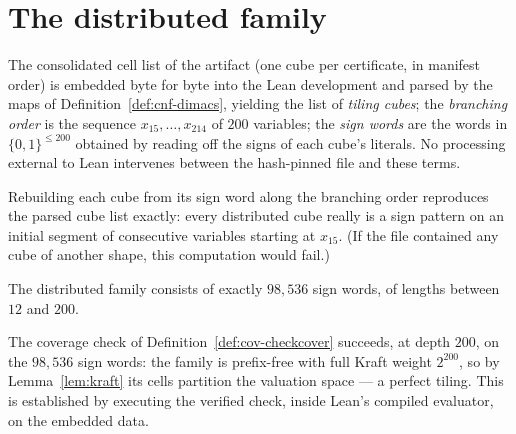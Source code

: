 \section{The distributed family}

\begin{definition}\label{def:cov-tiling}
The consolidated cell list of the artifact (one cube per certificate, in
manifest order) is embedded byte for byte into the Lean development and
parsed by the maps of Definition~\ref{def:cnf-dimacs}, yielding the list of
\emph{tiling cubes}; the \emph{branching order} is the sequence
$x_{15}, \dots, x_{214}$ of $200$ variables; the \emph{sign words} are the
words in $\{0,1\}^{\le 200}$ obtained by reading off the signs of each
cube's literals.  No processing external to Lean intervenes between the
hash-pinned file and these terms.
\leanok
{}
\end{definition}

\begin{fact}\label{fact:cov-tiling-signs}
Rebuilding each cube from its sign word along the branching order
reproduces the parsed cube list exactly: every distributed cube really is a
sign pattern on an initial segment of consecutive variables starting at
$x_{15}$.  (If the file contained any cube of another shape, this
computation would fail.)
\leanok
{}
\end{fact}

\begin{fact}[Cardinality]\label{fact:cov-tiling-count}
The distributed family consists of exactly $98{,}536$ sign words, of
lengths between $12$ and $200$.
\leanok
{}
\end{fact}

\begin{fact}\label{fact:tiling}
The coverage check of Definition~\ref{def:cov-checkcover} succeeds, at
depth $200$, on the $98{,}536$ sign words: the family is prefix-free with
full Kraft weight $2^{200}$, so by Lemma~\ref{lem:kraft} its cells
partition the valuation space --- a perfect tiling.  This is established by
executing the verified check, inside Lean's compiled evaluator, on the
embedded data.
\leanok
{}
\end{fact}

